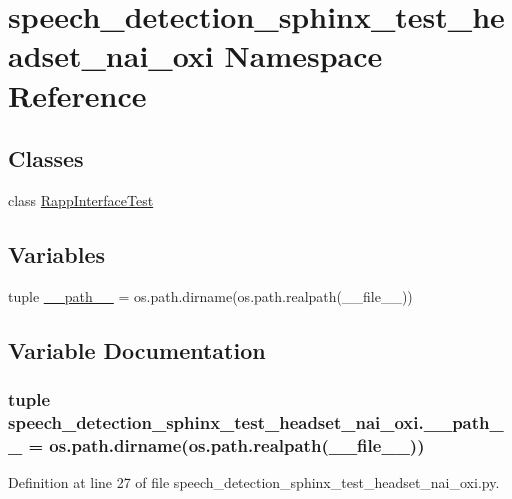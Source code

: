 \hypertarget{namespacespeech__detection__sphinx__test__headset__nai__oxi}{\section{speech\-\_\-detection\-\_\-sphinx\-\_\-test\-\_\-headset\-\_\-nai\-\_\-oxi Namespace Reference}
\label{namespacespeech__detection__sphinx__test__headset__nai__oxi}
}
\subsection*{Classes}
\begin{DoxyCompactItemize}
\item 
class \hyperlink{classspeech__detection__sphinx__test__headset__nai__oxi_1_1RappInterfaceTest}{Rapp\-Interface\-Test}
\end{DoxyCompactItemize}
\subsection*{Variables}
\begin{DoxyCompactItemize}
\item 
tuple \hyperlink{namespacespeech__detection__sphinx__test__headset__nai__oxi_ade784a9f42fdc1dec3bfb0c2fe0486d2}{\-\_\-\-\_\-path\-\_\-\-\_\-} = os.\-path.\-dirname(os.\-path.\-realpath(\-\_\-\-\_\-file\-\_\-\-\_\-))
\end{DoxyCompactItemize}


\subsection{Variable Documentation}
\hypertarget{namespacespeech__detection__sphinx__test__headset__nai__oxi_ade784a9f42fdc1dec3bfb0c2fe0486d2}{
\subsubsection[{\-\_\-\-\_\-path\-\_\-\-\_\-}]{\setlength{\rightskip}{0pt plus 5cm}tuple speech\-\_\-detection\-\_\-sphinx\-\_\-test\-\_\-headset\-\_\-nai\-\_\-oxi.\-\_\-\-\_\-path\-\_\-\-\_\- = os.\-path.\-dirname(os.\-path.\-realpath(\-\_\-\-\_\-file\-\_\-\-\_\-))}}\label{namespacespeech__detection__sphinx__test__headset__nai__oxi_ade784a9f42fdc1dec3bfb0c2fe0486d2}


Definition at line 27 of file speech\-\_\-detection\-\_\-sphinx\-\_\-test\-\_\-headset\-\_\-nai\-\_\-oxi.\-py.

